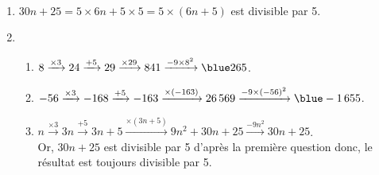 \ \\ [-5mm]
   \begin{enumerate}
      \item $30n+25 =5\times6n+5\times5 =5\times(6n+5)$ est {\blue divisible par 5}.
      \item
         \begin{enumerate}
            \item $8 \xrightarrow{\times3} 24 \xrightarrow{+5} 29 \xrightarrow{\times29} 841 \xrightarrow{-9\times8^2} {\blue 265}$.
            \item $-56 \xrightarrow{\times3} -168 \xrightarrow{+5} -163 \xrightarrow{\times(-163)} 26\,569 \xrightarrow{-9\times(-56)^2} {\blue -1\,655}$.
            \item $n \xrightarrow{\times3} 3n \xrightarrow{+5} 3n+5 \xrightarrow{\times(3n+5)} 9n^2+30n+25 \xrightarrow{-9n^2} 30n+25$. \\
               Or, $30n+25$ est divisible par 5 d'après la première question donc, {\blue le résultat est toujours divisible par 5}.
         \end{enumerate}
   \end{enumerate}

